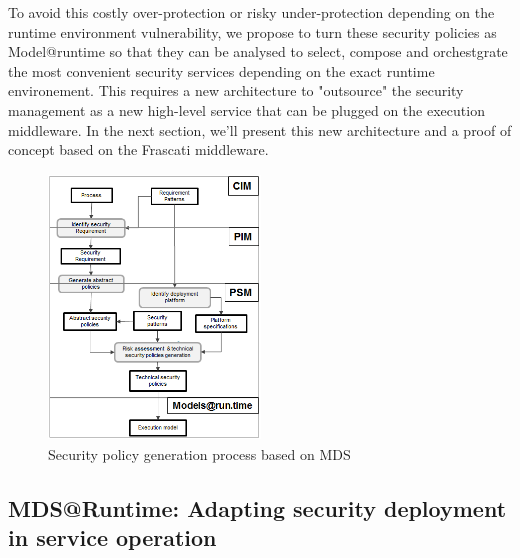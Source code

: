 \documentclass[runningheads,a4paper]{llncs}
\begin{document}
To avoid this costly over-protection or risky under-protection depending on the runtime environment vulnerability, we propose to turn these security policies as Model@runtime so that they can be analysed to select, compose and orchestgrate the most convenient security services depending on the exact runtime environement. This requires a new architecture to "outsource" the security management as a new high-level service that can be plugged on the execution middleware. In the next section, we'll present this new architecture and a proof of concept based on the Frascati middleware.







\begin{figure}  
\centering
\includegraphics[height=200pt, width=160pt]{mds.png}
\caption{Security policy generation process based on MDS}
\label{fig:mds}
\end{figure}




\subsection{MDS@Runtime: Adapting security deployment in service operation}
\end{document}
